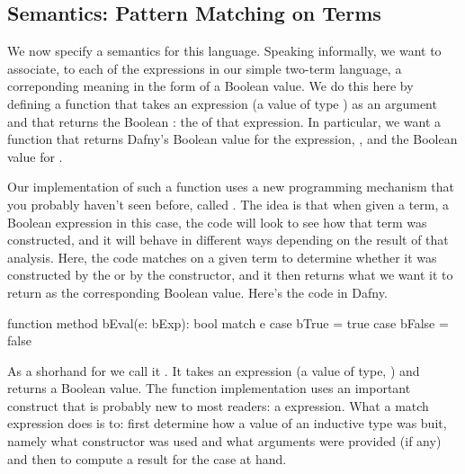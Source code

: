 \documentclass[letterpaper,10pt,english]{sphinxmanual}
\begin{document}
\subsection{Semantics: Pattern Matching on Terms}
\label{\detokenize{10-formal-languages:semantics-pattern-matching-on-terms}}
We now specify a semantics for this language. Speaking informally, we
want to associate, to each of the expressions in our simple two-term
language, a correponding meaning in the form of a Boolean value.  We
do this here by defining a function that takes an expression (a value
of type ) as an argument and that returns the Boolean :
the  of that expression.  In particular, we want a function
that returns Dafny’s Boolean value  for the expression, ,
and the Boolean value  for .

Our implementation of such a function uses a new programming mechanism
that you probably haven’t seen before, called . The
idea is that when given a term, a Boolean expression in this case, the
code will look to see how that term was constructed, and it will
behave in different ways depending on the result of that
analysis. Here, the code matches on a given term to determine whether
it was constructed by the  or by the  constructor, and
it then returns what we want it to return as the corresponding Boolean
value. Here’s the code in Dafny.

\begin{sphinxVerbatim}[commandchars=\\\{\}]
function method bEval(e: bExp): bool
\PYGZob{}
  match e
  \PYGZob{}
      case bTrue =\PYGZgt{} true
      case bFalse =\PYGZgt{} false
  \PYGZcb{}
\PYGZcb{}
\end{sphinxVerbatim}

As a shorhand for  we call it . It
takes an expression (a value of type, ) and returns a Boolean
value.  The function implementation uses an important construct that
is probably new to most readers: a  expression. What a match
expression does is to: first determine how a value of an inductive
type was buit, namely what constructor was used and what arguments
were provided (if any) and then to compute a result for the case at
hand.
\end{document}
